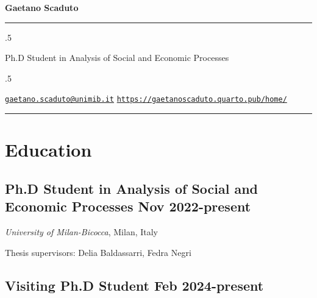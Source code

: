 \documentclass[8pt,]{article}
\providecommand{\tightlist}{%
  \setlength{\itemsep}{0pt}\setlength{\parskip}{0pt}}
\renewenvironment{itemize}{
  \begin{list}{}{
    \setlength{\leftmargin}{1.5em}
  }
}{
  \end{list}
}
\begin{document}
\centerline{\huge \bf Gaetano Scaduto}

\vspace{2 mm}

\hrule

\vspace{2 mm}

\moveleft.5\hoffset\centerline{Ph.D Student in Analysis of Social and
Economic Processes}

\moveleft.5\hoffset\centerline{ \faEnvelopeO \hspace{1 mm} \href{mailto:}{\tt \href{mailto:gaetano.scaduto@unimib.it}{\nolinkurl{gaetano.scaduto@unimib.it}}} \hspace{1 mm}      \faGlobe \hspace{1 mm} \href{http://\url{https://gaetanoscaduto.quarto.pub/home/}}{\tt \url{https://gaetanoscaduto.quarto.pub/home/}}   } 

\vspace{2 mm}

\hrule


\hypertarget{education}{%
\section{\texorpdfstring{\textbf{Education}}{Education}}\label{education}}

\hypertarget{ph.d-student-in-analysis-of-social-and-economic-processes-nov-2022-present}{%
\subsection{\texorpdfstring{Ph.D Student in Analysis of Social and
Economic Processes \hfill Nov
2022-present}{Ph.D Student in Analysis of Social and Economic Processes Nov 2022-present}}\label{ph.d-student-in-analysis-of-social-and-economic-processes-nov-2022-present}}

\begin{itemize}
\tightlist
\item
  \emph{University of Milan-Bicocca}, Milan, Italy
\item
  Thesis supervisors: Delia Baldassarri, Fedra Negri
\end{itemize}

\hypertarget{visiting-ph.d-student-feb-2024-present}{%
\subsection{\texorpdfstring{Visiting Ph.D Student \hfill Feb
2024-present}{Visiting Ph.D Student Feb 2024-present}}\label{visiting-ph.d-student-feb-2024-present}}
\end{document}
